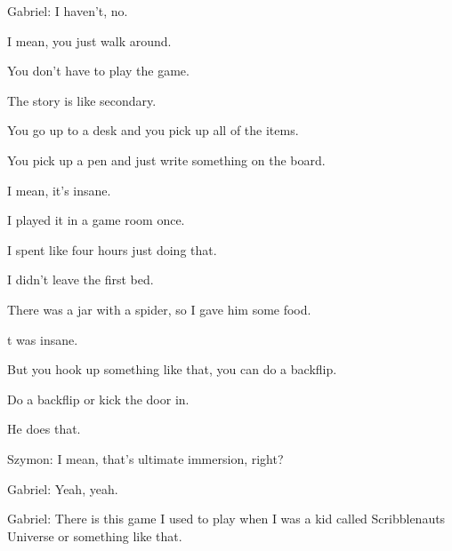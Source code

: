 \begin{QandA}
\begin{answered}
            Gabriel: I haven't, no.

            I mean, you just walk around.

            You don't have to play the game.

            The story is like secondary.

            You go up to a desk and you pick up all of the items.

            You pick up a pen and just write something on the board.

            I mean, it's insane.

            I played it in a game room once.

            I spent like four hours just doing that.

            I didn't leave the first bed.

            There was a jar with a spider, so I gave him some food.

            t was insane.

            But you hook up something like that, you can do a backflip.

            Do a backflip or kick the door in.

            He does that.

            Szymon: I mean, that's ultimate immersion, right?

            Gabriel: Yeah, yeah.

            Gabriel: There is this game I used to play when I was a kid called Scribblenauts Universe or something like that.


\end{answered}
\end{QandA}
